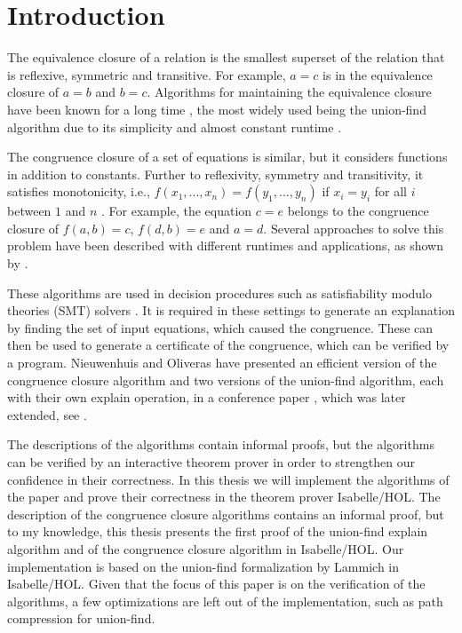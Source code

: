 
\chapter{Introduction}\label{chapter:introduction}

The equivalence closure of a relation is the smallest superset of the relation that is reflexive, symmetric and transitive. For example, $a = c$ is in the equivalence closure of $a = b$ and $b = c$. Algorithms for maintaining the equivalence closure have been known for a long time \cite{unionfind-og}, the most widely used being the union-find algorithm due to its simplicity and almost constant runtime \cite{Tarjan}.

The congruence closure of a set of equations is similar, but it considers functions in addition to constants. Further to reflexivity, symmetry and transitivity, it satisfies monotonicity, i.e., $f(x_1, ... ,x_n) = f(y_1, ... ,y_n)$ if $x_i = y_i$ for all $i$ between $1$ and $n$ \cite{Nieuwenhuis}. For example, the equation $c = e$ belongs to the congruence closure of $f(a,b) = c$, $f(d,b) = e$ and $a = d$. Several approaches to solve this problem have been described with different runtimes and applications, as shown by \cite{congruenceclosure-og2,congruenceclosure-og,congruenceclosure-og3,Nieuwenhuis}.

These algorithms are used in decision procedures such as satisfiability modulo theories (SMT) solvers \cite{z3}. It is required in these settings to generate an explanation by finding the set of input equations, which caused the congruence. These can then be used to generate a certificate of the congruence, which can be verified by a program. Nieuwenhuis and Oliveras have presented an efficient version of the congruence closure algorithm and two versions of the union-find algorithm, each with their own explain operation, in a conference paper \cite{Nieuwenhuis}, which was later extended, see \cite{Nieuwenhuis2}.

The descriptions of the algorithms contain informal proofs, but the algorithms can be verified by an interactive theorem prover in order to strengthen our confidence in their correctness. In this thesis we will implement the algorithms of the paper \cite{Nieuwenhuis} and prove their correctness in the theorem prover Isabelle/HOL.  The description of the congruence closure algorithms contains an informal proof, but to my knowledge, this thesis presents the first proof of the union-find explain algorithm and of the congruence closure algorithm in Isabelle/HOL. Our implementation is based on the union-find formalization by Lammich \cite{unionfind-isabelle} in Isabelle/HOL. Given that the focus of this paper is on the verification of the algorithms, a few optimizations are left out of the implementation, such as path compression for union-find.


